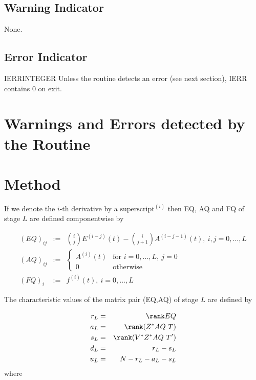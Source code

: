 \subsection{Warning Indicator}
None.

\subsection{Error Indicator}

\begin{entry}{IERR}{INTEGER}
  Unless the routine detects an error (see next section), IERR
  contains $0$ on exit.
\end{entry}

\section{Warnings and Errors detected by the Routine}


\section{Method}
If we denote the
$i$-th derivative by a $\mbox{superscript}^{(i)}$ then EQ, AQ and
FQ of stage $L$ are defined componentwise by

\begin{eqnarray*}
  (EQ)_{ij} &:=& {i \choose j} E^{(i-j)}(t)
  - {i \choose j+1}A^{(i-j-1)}(t),\ i,j=0,\dots,L \\
  (AQ)_{ij} &:=& \left\{
    \begin{array}{cl}
      A^{(i)}(t) & \mbox{for } i=0,\dots,L,\ j=0 \\
      0          & \mbox{otherwise}
    \end{array}
  \right. \\
  (FQ)_i &:=& f^{(i)}(t),\ i=0,\dots,L
\end{eqnarray*}

The characteristic values of the matrix pair (EQ,AQ) of stage $L$ are
defined by

\begin{eqnarray*}
  r_L &=& \rank EQ \\
  a_L &=& \rank (Z^* AQ\ T) \\
  s_L &=& \rank (V^* Z^* AQ\ T') \\
  d_L &=& r_L - s_L \\
  u_L &=& N - r_L - a_L - s_L
\end{eqnarray*}
where


